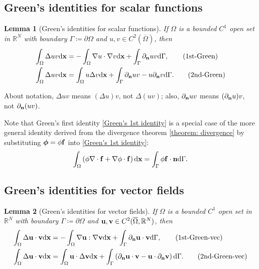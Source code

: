 \documentclass[oneside,11pt]{book}
\numberwithin{equation}{section}
\newtheorem{lemma}{Lemma}[section]
\begin{document}
\subsection{Green's identities for scalar functions}

\begin{lemma}[Green's identities for scalar functions]
    If $\Omega$ is a bounded $C^1$ open set in $\mathbb{R}^N$ with boundary $\Gamma\coloneqq\partial\Omega$ and $u,v\in C^2(\overline{\Omega})$, then
    \begin{align}
        \int_\Omega \Delta uv{\rm d}{\bf x} &= -\int_\Omega \nabla u\cdot\nabla v{\rm d}{\bf x} + \int_\Gamma \partial_{\bf n}uv{\rm d}\Gamma,\label{Green's 1st identity}\tag{1st-Green}\\
        \int_\Omega \Delta uv{\rm d}{\bf x} &= \int_\Omega u\Delta v{\rm d}{\bf x} + \int_\Gamma \partial_{\bf n}uv - u\partial_{\bf n}v{\rm d}\Gamma.\label{Green's 2nd identity}\tag{2nd-Green}
    \end{align}
\end{lemma}
About notation, $\Delta uv$ means $(\Delta u)v$, not $\Delta(uv)$; also, $\partial_{\bf n}uv$ means $(\partial_{\bf n}u)v$, not $\partial_{\bf n}(uv)$.

%
Note that Green's first identity \eqref{Green's 1st identity} is a special case of the more general identity derived from the divergence theorem \ref{theorem: divergence} by substituting $\boldsymbol{\phi} = \phi{\bf f}$ into \eqref{Green's 1st identity}:
\begin{align}
    \label{divergence theorem's consequence}
    \int_\Omega \left(\phi\nabla\cdot{\bf f} + \nabla\phi\cdot{\bf f}\right){\rm d}{\bf x} = \int_\Gamma \phi{\bf f}\cdot{\bf n}{\rm d}\Gamma.
\end{align}

\subsection{Green's identities for vector fields}
\begin{lemma}[Green's identities for vector fields]
    If $\Omega$ is a bounded $C^1$ open set in $\mathbb{R}^N$ with boundary $\Gamma\coloneqq\partial\Omega$ and ${\bf u},{\bf v}\in C^2(\overline{\Omega},\mathbb{R}^N)$, then
    \begin{align}
        \int_\Omega \Delta{\bf u}\cdot{\bf v}{\rm d}{\bf x} &= -\int_\Omega \nabla{\bf u}:\nabla{\bf v}{\rm d}{\bf x} + \int_\Gamma \partial_{\bf n}{\bf u}\cdot{\bf v}{\rm d}\Gamma,\label{Green's 1st identity vector}\tag{1st-Green-vec}\\
        \int_\Omega \Delta{\bf u}\cdot{\bf v}{\rm d}{\bf x} &= \int_\Omega {\bf u}\cdot\Delta{\bf v}{\rm d}{\bf x} + \int_\Gamma \left(\partial_{\bf n}{\bf u}\cdot{\bf v} - {\bf u}\cdot\partial_{\bf n}{\bf v}\right){\rm d}\Gamma.\label{Green's 2nd identity vector}\tag{2nd-Green-vec}
    \end{align}
\end{lemma}
\end{document}
